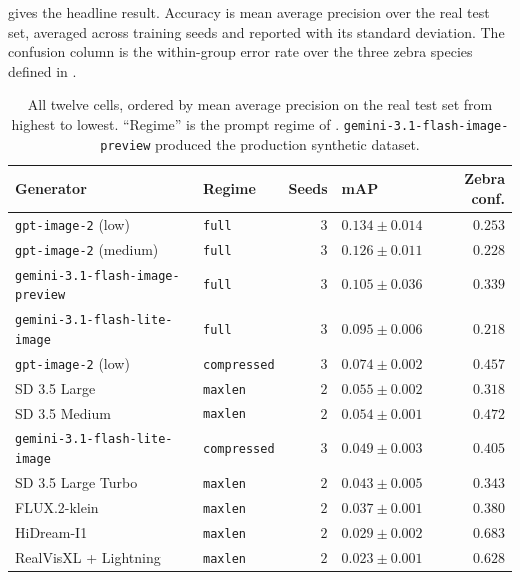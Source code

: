  gives the headline result. Accuracy is mean average precision over the real test set, averaged across training seeds and reported with its standard deviation. The confusion column is the within-group error rate over the three zebra species defined in .

\begin{table}[htbp]
\centering
\caption[Generator ranking by downstream accuracy]{All twelve cells, ordered by mean average precision on the real test set from highest to lowest. \enquote{Regime} is the prompt regime of . \texttt{gemini-3.1-flash-image-preview} produced the production synthetic dataset.}
\label{tab:generator-ranking}
\begin{tabular}{@{}llrlr@{}}
\toprule
Generator & Regime & Seeds & mAP & Zebra conf. \\
\midrule
\texttt{gpt-image-2} (low) & \texttt{full} & $3$ & $0.134 \pm 0.014$ & $0.253$ \\
\texttt{gpt-image-2} (medium) & \texttt{full} & $3$ & $0.126 \pm 0.011$ & $0.228$ \\
\texttt{gemini-3.1-flash-image-preview} & \texttt{full} & $3$ & $0.105 \pm 0.036$ & $0.339$ \\
\texttt{gemini-3.1-flash-lite-image} & \texttt{full} & $3$ & $0.095 \pm 0.006$ & $0.218$ \\
\texttt{gpt-image-2} (low) & \texttt{compressed} & $3$ & $0.074 \pm 0.002$ & $0.457$ \\
SD 3.5 Large & \texttt{maxlen} & $2$ & $0.055 \pm 0.002$ & $0.318$ \\
SD 3.5 Medium & \texttt{maxlen} & $2$ & $0.054 \pm 0.001$ & $0.472$ \\
\texttt{gemini-3.1-flash-lite-image} & \texttt{compressed} & $3$ & $0.049 \pm 0.003$ & $0.405$ \\
SD 3.5 Large Turbo & \texttt{maxlen} & $2$ & $0.043 \pm 0.005$ & $0.343$ \\
FLUX.2-klein & \texttt{maxlen} & $2$ & $0.037 \pm 0.001$ & $0.380$ \\
HiDream-I1 & \texttt{maxlen} & $2$ & $0.029 \pm 0.002$ & $0.683$ \\
RealVisXL + Lightning & \texttt{maxlen} & $2$ & $0.023 \pm 0.001$ & $0.628$ \\
\bottomrule
\end{tabular}
\end{table}


